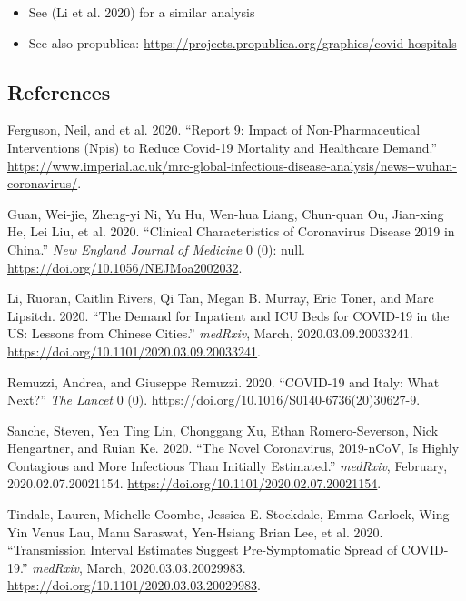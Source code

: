 \documentclass[
]{article}
\providecommand{\tightlist}{%
  \setlength{\itemsep}{0pt}\setlength{\parskip}{0pt}}
\begin{document}
\begin{itemize}
\tightlist
\item
  See (Li et al. 2020) for a similar analysis
\item
  See also propublica:
  \url{https://projects.propublica.org/graphics/covid-hospitals}
\end{itemize}

\hypertarget{references}{%
\subsection*{References}\label{references}}

\hypertarget{refs}{}
\leavevmode\hypertarget{ref-ferguson20}{}%
Ferguson, Neil, and et al. 2020. ``Report 9: Impact of
Non-Pharmaceutical Interventions (Npis) to Reduce Covid-19 Mortality and
Healthcare Demand.''
\url{https://www.imperial.ac.uk/mrc-global-infectious-disease-analysis/news--wuhan-coronavirus/}.

\leavevmode\hypertarget{ref-guan2020}{}%
Guan, Wei-jie, Zheng-yi Ni, Yu Hu, Wen-hua Liang, Chun-quan Ou,
Jian-xing He, Lei Liu, et al. 2020. ``Clinical Characteristics of
Coronavirus Disease 2019 in China.'' \emph{New England Journal of
Medicine} 0 (0): null. \url{https://doi.org/10.1056/NEJMoa2002032}.

\leavevmode\hypertarget{ref-li2020}{}%
Li, Ruoran, Caitlin Rivers, Qi Tan, Megan B. Murray, Eric Toner, and
Marc Lipsitch. 2020. ``The Demand for Inpatient and ICU Beds for
COVID-19 in the US: Lessons from Chinese Cities.'' \emph{medRxiv},
March, 2020.03.09.20033241.
\url{https://doi.org/10.1101/2020.03.09.20033241}.

\leavevmode\hypertarget{ref-remuzzi2020}{}%
Remuzzi, Andrea, and Giuseppe Remuzzi. 2020. ``COVID-19 and Italy: What
Next?'' \emph{The Lancet} 0 (0).
\url{https://doi.org/10.1016/S0140-6736(20)30627-9}.

\leavevmode\hypertarget{ref-sanche2020}{}%
Sanche, Steven, Yen Ting Lin, Chonggang Xu, Ethan Romero-Severson, Nick
Hengartner, and Ruian Ke. 2020. ``The Novel Coronavirus, 2019-nCoV, Is
Highly Contagious and More Infectious Than Initially Estimated.''
\emph{medRxiv}, February, 2020.02.07.20021154.
\url{https://doi.org/10.1101/2020.02.07.20021154}.

\leavevmode\hypertarget{ref-tindale2020}{}%
Tindale, Lauren, Michelle Coombe, Jessica E. Stockdale, Emma Garlock,
Wing Yin Venus Lau, Manu Saraswat, Yen-Hsiang Brian Lee, et al. 2020.
``Transmission Interval Estimates Suggest Pre-Symptomatic Spread of
COVID-19.'' \emph{medRxiv}, March, 2020.03.03.20029983.
\url{https://doi.org/10.1101/2020.03.03.20029983}.
\end{document}
